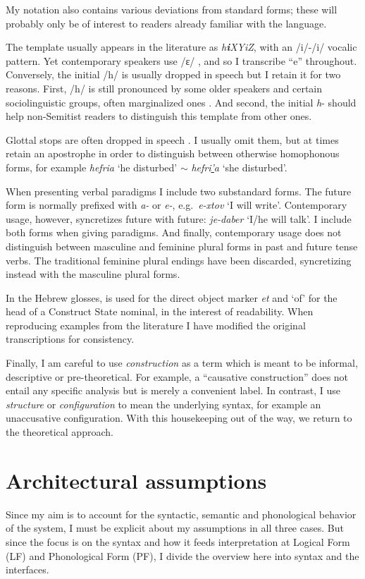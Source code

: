 My notation also contains various deviations from standard forms; these will probably only be of interest to readers already familiar with the language.

The template {\thif} usually appears in the literature as \emph{h\textbf{i}XYiZ}, with an /i/-/i/ vocalic pattern. Yet contemporary speakers use /ɛ/ \citep{trachtman16}, and so I transcribe ``e'' throughout. Conversely, the initial /h/ is usually dropped in speech but I retain it for two reasons. First, /h/ is still pronounced by some older speakers and certain sociolinguistic groups, often marginalized ones \citep[cf.~][]{schwarzwald81biu,gafter14phd}. And second, the initial \emph{h}- should help non-Semitist readers to distinguish this template from other ones.

Glottal stops are often dropped in speech \citep{enguehardfaust18}. I usually omit them, but at times retain an apostrophe in order to distinguish between otherwise homophonous forms, for example \emph{hefria} `he disturbed' $\sim$ \emph{hefri\underline{'}a} `she disturbed'.

When presenting verbal paradigms I include two substandard forms. The  future form is normally prefixed with \emph{a-} or \emph{e-}, e.g.~\emph{e-xtov} `I will write'. Contemporary usage, however, syncretizes  future with  future: \emph{je-daber} `I/he will talk'. I include both forms when giving paradigms. And finally, contemporary usage does not distinguish between masculine and feminine plural forms in past and future tense verbs. The traditional feminine plural endings have been discarded, syncretizing instead with the masculine plural forms.

In the Hebrew glosses,  is used for the direct object marker \emph{et} and `of' for the head of a Construct State nominal, in the interest of readability. When reproducing examples from the literature I have modified the original transcriptions for consistency.

Finally, I am careful to use \emph{construction} as a term which is meant to be informal, descriptive or pre-theoretical. For example, a ``causative construction'' does not entail any specific analysis but is merely a convenient label. In contrast, I use \emph{structure} or \emph{configuration} to mean the underlying syntax, for example an unaccusative configuration. With this housekeeping out of the way, we return to the theoretical approach.


\section{Architectural assumptions} \label{intro:arch}
Since my aim is to account for the syntactic, semantic and phonological behavior of the system, I must be explicit about my assumptions in all three cases. But since the focus is on the syntax and how it feeds interpretation at Logical Form (LF) and Phonological Form (PF), I divide the overview here into syntax and the interfaces.

